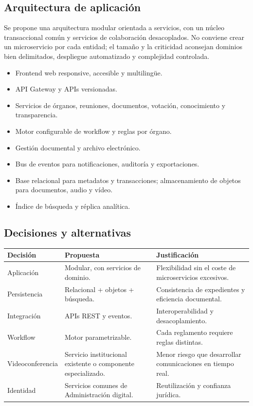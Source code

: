 \documentclass[11pt,a4paper]{article}
\begin{document}
\subsection{Arquitectura de aplicación}

Se propone una arquitectura modular orientada a servicios, con un núcleo transaccional común y servicios de colaboración desacoplados. No conviene crear un microservicio por cada entidad; el tamaño y la criticidad aconsejan dominios bien delimitados, despliegue automatizado y complejidad controlada.

\begin{itemize}
\item Frontend web responsive, accesible y multilingüe.
\item API Gateway y APIs versionadas.
\item Servicios de órganos, reuniones, documentos, votación, conocimiento y transparencia.
\item Motor configurable de workflow y reglas por órgano.
\item Gestión documental y archivo electrónico.
\item Bus de eventos para notificaciones, auditoría y exportaciones.
\item Base relacional para metadatos y transacciones; almacenamiento de objetos para documentos, audio y vídeo.
\item Índice de búsqueda y réplica analítica.
\end{itemize}

\subsection{Decisiones y alternativas}
\begin{center}
\begin{tabularx}{0.95\textwidth}{l Y Y}\toprule
\textbf{Decisión} & \textbf{Propuesta} & \textbf{Justificación}\\\midrule
Aplicación & Modular, con servicios de dominio. & Flexibilidad sin el coste de microservicios excesivos.\\
Persistencia & Relacional + objetos + búsqueda. & Consistencia de expedientes y eficiencia documental.\\
Integración & APIs REST y eventos. & Interoperabilidad y desacoplamiento.\\
Workflow & Motor parametrizable. & Cada reglamento requiere reglas distintas.\\
Videoconferencia & Servicio institucional existente o componente especializado. & Menor riesgo que desarrollar comunicaciones en tiempo real.\\
Identidad & Servicios comunes de Administración digital. & Reutilización y confianza jurídica.\\
\bottomrule\end{tabularx}\end{center}
\end{document}
